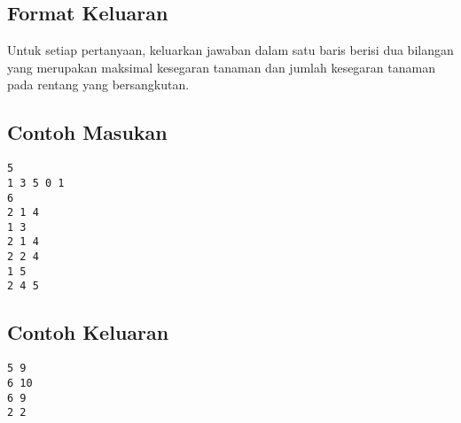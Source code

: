 \documentclass{article}
\begin{document}
\subsection*{Format Keluaran}

Untuk setiap pertanyaan, keluarkan jawaban dalam satu baris berisi dua bilangan yang merupakan maksimal kesegaran tanaman dan jumlah kesegaran tanaman pada rentang yang bersangkutan.

\begin{multicols}{2}
\subsection*{Contoh Masukan}
\begin{lstlisting}
5
1 3 5 0 1
6
2 1 4
1 3
2 1 4
2 2 4
1 5
2 4 5
\end{lstlisting}
\columnbreak
\subsection*{Contoh Keluaran}
\begin{lstlisting}
5 9
6 10
6 9
2 2

\end{lstlisting}
\vfill
\null
\end{multicols}


\pagebreak
\end{document}
